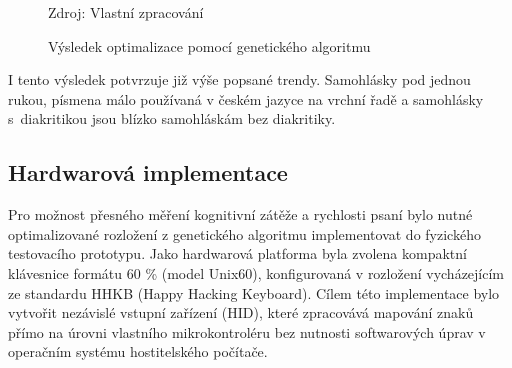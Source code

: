 \documentclass[a4paper, twoside, 12pt, czech]{article}
\begin{document}
\begin{figure}[H]
    
    \centering
    \caption{Výsledek optimalizace pomocí genetického algoritmu}
    \vspace{0.5cm}
    \begin{keyboardlayout}
                     
        \newrow
        
                     
        \newrow
        
                    
        \newrow
        
                   
        \newrow
        
               
    \end{keyboardlayout}
    \small{Zdroj: Vlastní zpracování}
    \label{fig:GA-layout}
\end{figure}

I tento výsledek potvrzuje již výše popsané trendy. Samohlásky pod jednou rukou,
písmena málo používaná v českém jazyce na vrchní řadě a samohlásky s~diakritikou 
jsou blízko samohláskám bez diakritiky.

\subsection{Hardwarová implementace}
Pro možnost přesného měření kognitivní zátěže a rychlosti psaní bylo nutné 
optimalizované rozložení z genetického algoritmu implementovat do fyzického 
testovacího prototypu. Jako hardwarová platforma byla zvolena kompaktní kláves\-nice 
formátu 60 \% (model Unix60), konfigurovaná v rozložení vycházejícím ze standardu 
HHKB (Happy Hacking Keyboard). Cílem této implementace bylo vytvořit nezávislé 
vstupní zařízení (HID), které zpracovává mapování znaků přímo na úrovni vlastního 
mikrokontroléru bez nutnosti softwarových úprav v operačním systému hostitelského 
počítače.
\end{document}
